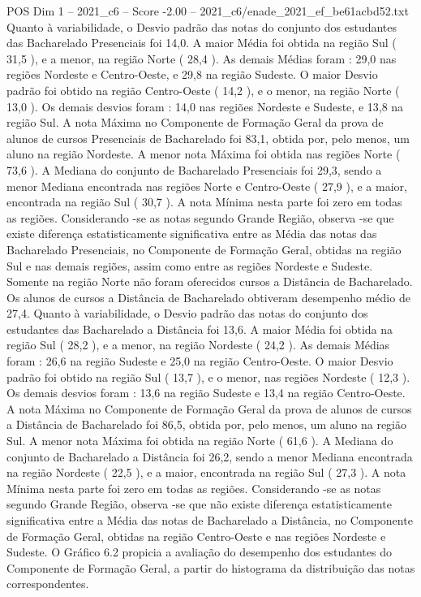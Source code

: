 \begin{textsample}{POS Dim 1 – 2021\_c6 – Score -2.00 – 2021\_c6/enade\_2021\_ef\_be61acbd52.txt}
Quanto à variabilidade, o Desvio padrão das notas do conjunto dos estudantes das Bacharelado Presenciais foi 14,0.
A maior Média foi obtida na região Sul ( 31,5 ), e a menor, na região Norte ( 28,4 ).
As demais Médias foram : 29,0 nas regiões Nordeste e Centro-Oeste, e 29,8 na região Sudeste.
O maior Desvio padrão foi obtido na região Centro-Oeste ( 14,2 ), e o menor, na região Norte ( 13,0 ).
Os demais desvios foram : 14,0 nas regiões Nordeste e Sudeste, e 13,8 na região Sul.
A nota Máxima no Componente de Formação Geral da prova de alunos de cursos Presenciais de Bacharelado foi 83,1, obtida por, pelo menos, um aluno na região Nordeste.
A menor nota Máxima foi obtida nas regiões Norte ( 73,6 ).
A Mediana do conjunto de Bacharelado Presenciais foi 29,3, sendo a menor Mediana encontrada nas regiões Norte e Centro-Oeste ( 27,9 ), e a maior, encontrada na região Sul ( 30,7 ).
A nota Mínima nesta parte foi zero em todas as regiões.
Considerando -se as notas segundo Grande Região, observa -se que existe diferença estatisticamente significativa entre as Média das notas das Bacharelado Presenciais, no Componente de Formação Geral, obtidas na região Sul e nas demais regiões, assim como entre as regiões Nordeste e Sudeste.
Somente na região Norte não foram oferecidos cursos a Distância de Bacharelado.
Os alunos de cursos a Distância de Bacharelado obtiveram desempenho médio de 27,4.
Quanto à variabilidade, o Desvio padrão das notas do conjunto dos estudantes das Bacharelado a Distância foi 13,6.
A maior Média foi obtida na região Sul ( 28,2 ), e a menor, na região Nordeste ( 24,2 ).
As demais Médias foram : 26,6 na região Sudeste e 25,0 na região Centro-Oeste.
O maior Desvio padrão foi obtido na região Sul ( 13,7 ), e o menor, nas regiões Nordeste ( 12,3 ).
Os demais desvios foram : 13,6 na região Sudeste e 13,4 na região Centro-Oeste.
A nota Máxima no Componente de Formação Geral da prova de alunos de cursos a Distância de Bacharelado foi 86,5, obtida por, pelo menos, um aluno na região Sul.
A menor nota Máxima foi obtida na região Norte ( 61,6 ).
A Mediana do conjunto de Bacharelado a Distância foi 26,2, sendo a menor Mediana encontrada na região Nordeste ( 22,5 ), e a maior, encontrada na região Sul ( 27,3 ).
A nota Mínima nesta parte foi zero em todas as regiões.
Considerando -se as notas segundo Grande Região, observa -se que não existe diferença estatisticamente significativa entre a Média das notas de Bacharelado a Distância, no Componente de Formação Geral, obtidas na região Centro-Oeste e nas regiões Nordeste e Sudeste.
O Gráfico 6.2 propicia a avaliação do desempenho dos estudantes do Componente de Formação Geral, a partir do histograma da distribuição das notas correspondentes.

\end{textsample}
